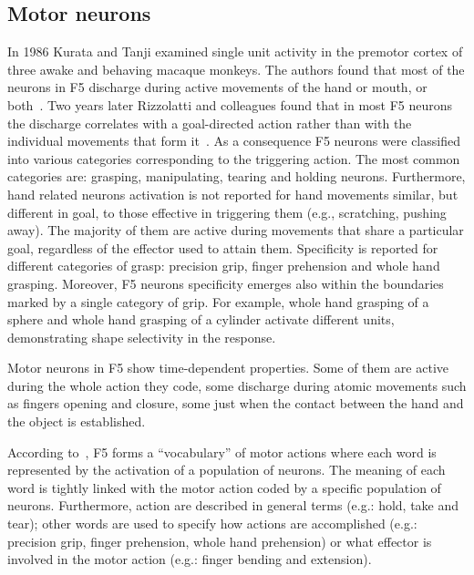 \subsection{Motor neurons}
\label{sec:actions:F5:motor}
In 1986 Kurata and Tanji examined single unit activity in the premotor cortex of
three awake and behaving macaque monkeys. 
The authors found that most of the neurons in F5 discharge during active
movements of the hand or mouth, or both~\citep{kurata.tanji.1986}.
Two years later Rizzolatti and colleagues found that in most F5 neurons the
discharge correlates with a goal-directed action rather than with the individual
movements that form it~\citep{rizzolatti.etal:1988}.
As a consequence F5 neurons were classified into various categories
corresponding to the triggering action.
The most common categories are: grasping, manipulating, tearing and holding
neurons.
Furthermore, hand related neurons activation is not reported for hand movements
similar, but different in goal, to those effective in triggering them (e.g.,
scratching, pushing away).
The majority of them are active during movements that share a particular goal,
regardless of the effector used to attain them.
Specificity is reported for different categories of grasp: precision grip,
finger prehension and  whole hand grasping.
Moreover, F5 neurons specificity emerges also within the boundaries marked by a
single category of grip.
For example, whole hand grasping of a sphere and whole hand grasping of a
cylinder activate different units, demonstrating shape selectivity in the
response.

Motor neurons in F5 show time-dependent properties. Some of them are
active during the whole action they code, some discharge during atomic
movements such as fingers opening and closure, some just when the contact
between the hand and the object is established.

According to~\citet{metta.etal:2006,fadiga.etal:PRESS}, F5 forms a 
``vocabulary'' of motor actions where each word is represented by the activation
of a population of neurons.
The meaning of each word is tightly linked with the motor action coded by a
specific population of neurons. 
Furthermore, action are described in general terms (e.g.: hold, take and
tear); other words are used to specify how actions are accomplished (e.g.:
precision grip, finger prehension, whole hand prehension) or what effector is
involved in the motor action (e.g.: finger bending and extension). 
